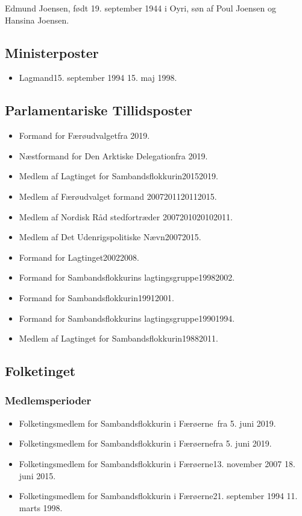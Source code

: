 \documentclass[11pt, a4paper]{awesome-cv}
\begin{document}
\makecvheader[R]
\makelettertitle
\begin{cvletter}
Edmund Joensen, født 19. september 1944 i Oyri, søn af Poul Joensen og Hansina Joensen.

\subsection*{Ministerposter}
\begin{itemize}
\item Lagmand15. september 1994  15. maj 1998.
\end{itemize}
\subsection*{Parlamentariske Tillidsposter}
\begin{itemize}
\item Formand for Færøudvalgetfra 2019.
\item Næstformand for Den Arktiske Delegationfra 2019.
\item Medlem af Lagtinget for Sambandsflokkurin20152019.
\item Medlem af Færøudvalget formand 2007201120112015.
\item Medlem af Nordisk Råd stedfortræder 2007201020102011.
\item Medlem af Det Udenrigspolitiske Nævn20072015.
\item Formand for Lagtinget20022008.
\item Formand for Sambandsflokkurins lagtingsgruppe19982002.
\item Formand for Sambandsflokkurin19912001.
\item Formand for Sambandsflokkurins lagtingsgruppe19901994.
\item Medlem af Lagtinget for Sambandsflokkurin19882011.
\end{itemize}
\subsection*{Folketinget}
\subsubsection*{Medlemsperioder}
\begin{itemize}
\item Folketingsmedlem for Sambandsflokkurin i Færøerne fra 5. juni 2019.
\item Folketingsmedlem for Sambandsflokkurin i Færøernefra 5. juni 2019.
\item Folketingsmedlem for Sambandsflokkurin i Færøerne13. november 2007  18. juni 2015.
\item Folketingsmedlem for Sambandsflokkurin i Færøerne21. september 1994  11. marts 1998.
\end{itemize}

\end{cvletter}
\end{document}
